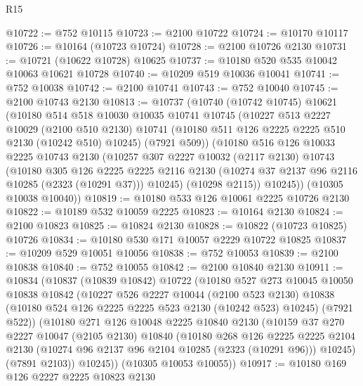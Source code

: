 \begin{lexlean}{R15}
\begin{coremodule}
@10722 := @752 @10115
@10723 := @2100 @10722
@10724 := @10170 @10117
@10726 := @10164 (@10723 @10724)
@10728 := @2100 @10726 @2130
@10731 := @10721 (@10622 @10728) @10625
@10737 := @10180 @520 @535 @10042 @10063 @10621 @10728
@10740 := @10209 @519 @10036 @10041
@10741 := @752 @10038
@10742 := @2100 @10741
@10743 := @752 @10040
@10745 := @2100 @10743 @2130
@10813 := @10737
    (@10740
      (@10742 @10745)
      @10621
      (@10180
        @514
        @518
        @10030
        @10035
        @10741
        @10745
        (@10227
          @513
          @2227
          @10029
          (@2100 @510 @2130)
          @10741
          (@10180 @511 @126 @2225 @2225 @510 @2130 (@10242 @510) @10245)
          (@7921 @509))
        (@10180
          @516
          @126
          @10033
          @2225
          @10743
          @2130
          (@10257
            @307
            @2227
            @10032
            (@2117 @2130)
            @10743
            (@10180
              @305
              @126
              @2225
              @2225
              @2116
              @2130
              (@10274 @37 @2137 @96 @2116 @10285 (@2323 (@10291 @37)))
              @10245)
            (@10298 @2115))
          @10245))
      (@10305 @10038 @10040))
@10819 := @10180 @533 @126 @10061 @2225 @10726 @2130
@10822 := @10189 @532 @10059 @2225
@10823 := @10164 @2130
@10824 := @2100 @10823
@10825 := @10824 @2130
@10828 := @10822 (@10723 @10825) @10726
@10834 := @10180 @530 @171 @10057 @2229 @10722 @10825
@10837 := @10209 @529 @10051 @10056
@10838 := @752 @10053
@10839 := @2100 @10838
@10840 := @752 @10055
@10842 := @2100 @10840 @2130
@10911 := @10834
    (@10837
      (@10839 @10842)
      @10722
      (@10180
        @527
        @273
        @10045
        @10050
        @10838
        @10842
        (@10227
          @526
          @2227
          @10044
          (@2100 @523 @2130)
          @10838
          (@10180 @524 @126 @2225 @2225 @523 @2130 (@10242 @523) @10245)
          (@7921 @522))
        (@10180
          @271
          @126
          @10048
          @2225
          @10840
          @2130
          (@10159
            @37
            @270
            @2227
            @10047
            (@2105 @2130)
            @10840
            (@10180
              @268
              @126
              @2225
              @2225
              @2104
              @2130
              (@10274 @96 @2137 @96 @2104 @10285 (@2323 (@10291 @96)))
              @10245)
            (@7891 @2103))
          @10245))
      (@10305 @10053 @10055))
@10917 := @10180 @169 @126 @2227 @2225 @10823 @2130

\end{coremodule}
\end{lexlean}
